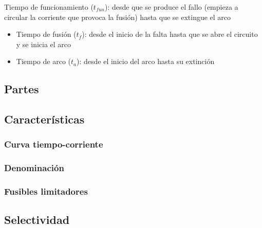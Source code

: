 Tiempo de funcionamiento ($t_{fun}$): desde que se produce el fallo (empieza a circular la corriente que provoca la fusión)  hasta que se extingue el arco
\begin{itemize}
    \item Tiempo de fusión ($t_f$): desde el inicio de la falta hasta que se abre el circuito y se inicia el arco
    \item Tiempo de arco ($t_a$): desde el inicio del arco hasta su extinción
\end{itemize}

\subsection{Partes}

\subsection{Características}
\subsubsection{Curva tiempo-corriente}
\subsubsection{Denominación}
\subsubsection{Fusibles limitadores}

\subsection{Selectividad}